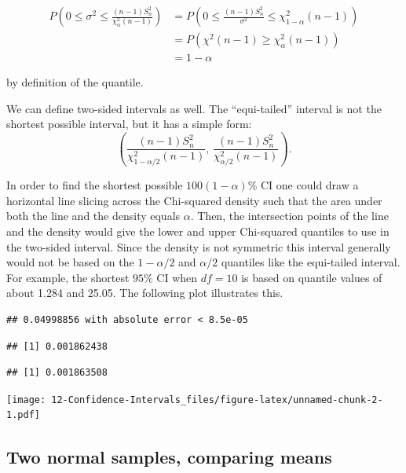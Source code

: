 \documentclass[]{book}
\begin{document}
\begin{align*}
P(0 \leq \sigma^2 \leq \frac{(n-1)S_n^2}{\chi^2_{\alpha}(n-1)}) &= P(0\leq \frac{(n-1)S_n^2}{\sigma^2} \leq \chi^2_{1-\alpha}(n-1))\\
& = P(\chi^2(n-1) \geq \chi^2_{\alpha}(n-1))\\
&= 1-\alpha
\end{align*}

by definition of the quantile.

We can define two-sided intervals as well. The ``equi-tailed'' interval
is not the shortest possible interval, but it has a simple form:
\[\left(\frac{(n-1)S_n^2}{\chi^2_{1-\alpha/2}(n-1)}, \, \frac{(n-1)S_n^2}{\chi^2_{\alpha/2}(n-1)}\right).\]

In order to find the shortest possible \(100(1-\alpha)\%\) CI one could
draw a horizontal line slicing across the Chi-squared density such that
the area under both the line and the density equals \(\alpha\). Then,
the intersection points of the line and the density would give the lower
and upper Chi-squared quantiles to use in the two-sided interval. Since
the density is not symmetric this interval generally would not be based
on the \(1-\alpha/2\) and \(\alpha/2\) quantiles like the equi-tailed
interval. For example, the shortest \(95\%\) CI when \(df=10\) is based
on quantile values of about 1.284 and 25.05. The following plot
illustrates this.

\begin{verbatim}
## 0.04998856 with absolute error < 8.5e-05
\end{verbatim}

\begin{verbatim}
## [1] 0.001862438
\end{verbatim}

\begin{verbatim}
## [1] 0.001863508
\end{verbatim}

\texttt{[image: 12-Confidence-Intervals\_files/figure-latex/unnamed-chunk-2-1.pdf]}

\subsection{Two normal samples, comparing
means}\label{two-normal-samples-comparing-means}
\end{document}
